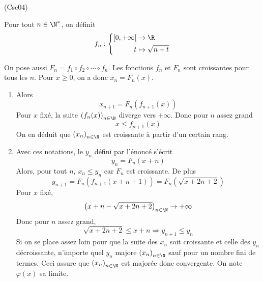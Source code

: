 \begin{tiny}(Csc04)\end{tiny} 
Pour tout $n\in \N^*$, on définit
\begin{displaymath}
  f_n:
\left\lbrace 
\begin{aligned}
  \left[  0, + \infty \right[  &\rightarrow \R \\ t &\mapsto \sqrt{n + t}
\end{aligned}
\right. 
\end{displaymath}

On pose aussi $F_n = f_1\circ f_2 \circ \cdots \circ f_n$.
Les fonctions $f_n$ et $F_n$ sont croissantes pour tous les $n$.\newline
Pour $x\geq 0$, on a donc $x_n = F_n(x)$.
\begin{enumerate}
  \item Alors
\begin{displaymath}
  x_{n+1} = F_n(f_{n+1}(x))
\end{displaymath}
Pour $x$ fixé, la suite $\left( f_n(x)\right)_{n\in \N}$ diverge vers $+\infty$. Donc pour $n$ assez grand
\begin{displaymath}
  x \leq f_{n+1}(x)
\end{displaymath}
On en déduit que $\left( x_n\right)_{n\in \N}$ est croissante à partir d'un certain rang.

\item Avec ces notations, le $y_n$ défini par l'énoncé s'écrit 
\begin{displaymath}
  y_n = F_n(x+n)
\end{displaymath}
Alors, pour tout $n$, $x_n \leq y_n$ car $F_n$ est croissante. De plus
\begin{displaymath}
  y_{n+1} = F_n(f_{n+1}(x+n+1))=F_n(\sqrt{x+2n+2})
\end{displaymath}
Pour $x$ fixé,
\begin{displaymath}
\left( x+n - \sqrt{x+2n+2}\right)_{n\in \N} \rightarrow +\infty  
\end{displaymath}
Donc pour $n$ assez grand,
\begin{displaymath}
  \sqrt{x+2n+2} \leq x + n \Rightarrow y_{n+1} \leq y_n 
\end{displaymath}
Si on se place assez loin pour que la suite des $x_n$ soit croissante et celle des $y_n$ décroissante, n'importe quel $y_n$ majore $\left( x_n\right)_{n\in \N}$ sauf pour un nombre fini de termes. Ceci assure que $\left( x_n\right)_{n\in \N}$ est majorée donc convergente. On note $\varphi(x)$ sa limite.


\end{enumerate}

